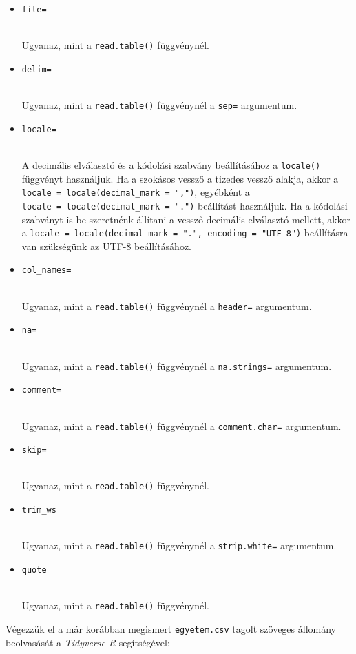\documentclass[
]{book}
\providecommand{\tightlist}{%
  \setlength{\itemsep}{0pt}\setlength{\parskip}{0pt}}
\begin{document}
\begin{itemize}
\tightlist
\item
  \texttt{file=}\strut \\
  Ugyanaz, mint a \texttt{read.table()} függvénynél.
\item
  \texttt{delim=}\strut \\
  Ugyanaz, mint a \texttt{read.table()} függvénynél a \texttt{sep=} argumentum.
\item
  \texttt{locale=}\strut \\
  A decimális elválasztó és a kódolási szabvány beállításához a \texttt{locale()} függvényt használjuk. Ha a szokásos vessző a tizedes vessző alakja, akkor a \texttt{locale\ =\ locale(decimal\_mark\ =\ ",")}, egyébként a \texttt{locale\ =\ locale(decimal\_mark\ =\ ".")} beállítást használjuk. Ha a kódolási szabványt is be szeretnénk állítani a vessző decimális elválasztó mellett, akkor a \texttt{locale\ =\ locale(decimal\_mark\ =\ ".",\ encoding\ =\ "UTF-8")} beállításra van szükségünk az UTF-8 beállításához.
\item
  \texttt{col\_names=}\strut \\
  Ugyanaz, mint a \texttt{read.table()} függvénynél a \texttt{header=} argumentum.
\item
  \texttt{na=}\strut \\
  Ugyanaz, mint a \texttt{read.table()} függvénynél a \texttt{na.strings=} argumentum.
\item
  \texttt{comment=}\strut \\
  Ugyanaz, mint a \texttt{read.table()} függvénynél a \texttt{comment.char=} argumentum.
\item
  \texttt{skip=}\strut \\
  Ugyanaz, mint a \texttt{read.table()} függvénynél.
\item
  \texttt{trim\_ws}\strut \\
  Ugyanaz, mint a \texttt{read.table()} függvénynél a \texttt{strip.white=} argumentum.
\item
  \texttt{quote}\strut \\
  Ugyanaz, mint a \texttt{read.table()} függvénynél.
\end{itemize}

Végezzük el a már korábban megismert \texttt{egyetem.csv} tagolt szöveges állomány beolvasását a \emph{Tidyverse R} segítségével:
\end{document}
